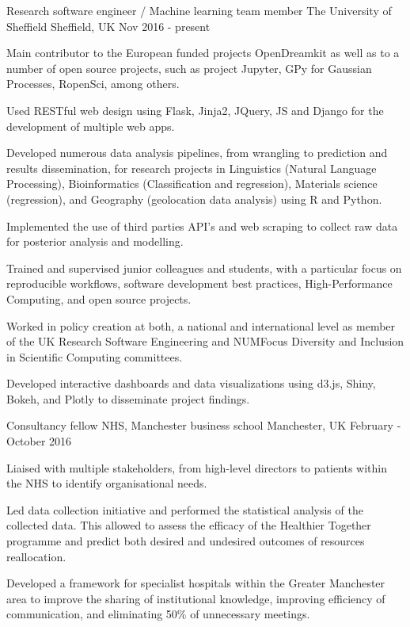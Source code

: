 \begin{cventries}
\cventry
{Research software engineer  / Machine learning team member } %
{The University of Sheffield } %
{Sheffield, UK} %
{Nov 2016 - present } %
{ %
\begin{cvitems}
\item {Main contributor to  the European funded projects OpenDreamkit as well as to a number of open source projects, such as project Jupyter, GPy for Gaussian Processes, RopenSci, among others.}
\item {Used RESTful web design using Flask, Jinja2, JQuery, JS and Django for the development of multiple web apps.}
\item {Developed numerous data analysis pipelines, from wrangling to prediction and results dissemination, for research projects in Linguistics (Natural Language Processing), Bioinformatics (Classification and regression), Materials science (regression), and Geography (geolocation data analysis) using R and Python.}
\item { Implemented the use of third parties API's and web scraping to collect raw data for posterior analysis and modelling.}
\item {Trained and supervised junior colleagues and students, with a particular focus on reproducible workflows, software development best practices, High-Performance Computing, and open source projects.}
\item {Worked in policy creation at both, a national and international level as member of the UK Research Software Engineering and NUMFocus Diversity and Inclusion in Scientific Computing committees.}
\item {Developed interactive dashboards and data visualizations using d3.js, Shiny, Bokeh, and Plotly to disseminate project findings.}
\end{cvitems}
}



\cventry
{Consultancy fellow}
{NHS, Manchester business school}
{Manchester, UK}
{February - October 2016}
{
\begin{cvitems}
\item {Liaised with multiple stakeholders, from high-level directors to patients within the NHS to identify organisational needs.}
\item  {Led data collection initiative and performed the statistical analysis of the collected data. This allowed to assess the efficacy of the Healthier Together programme and predict both desired and undesired outcomes of resources reallocation.}
\item{Developed a framework for specialist hospitals within the Greater Manchester area to improve the sharing of institutional knowledge, improving efficiency of communication, and eliminating 50\% of unnecessary meetings.}
\end{cvitems}
}



\end{cventries}

